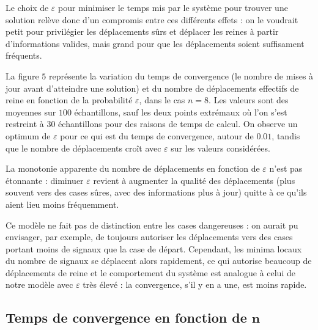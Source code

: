 \documentclass[11pt, openany]{article}
\begin{document}
Le choix de $\varepsilon$ pour minimiser le temps mis par le système pour trouver une solution relève donc d'un compromis entre ces différents effets : on le voudrait petit pour privilégier les déplacements sûrs et déplacer les reines à partir d'informations valides, mais grand pour que les déplacements soient suffisament fréquents.

La figure $5$ représente la variation du temps de convergence (le nombre de mises à jour avant d'atteindre une solution) et du nombre de déplacements effectifs de reine en fonction de la probabilité $\varepsilon$, dans le cas $n=8$. Les valeurs sont des moyennes sur $100$ échantillons, sauf les deux points extrémaux où l'on s'est restreint à $30$ échantillons pour des raisons de temps de calcul. On observe un optimum de $\varepsilon$ pour ce qui est du temps de convergence, autour de $0.01$, tandis que le nombre de déplacements croît avec $\varepsilon$ sur les valeurs considérées. 

La monotonie apparente du nombre de déplacements en fonction de $\varepsilon$ n'est pas étonnante : diminuer $\varepsilon$ revient à augmenter la qualité des déplacements (plus souvent vers des cases sûres, avec des informations plus à jour) quitte à ce qu'ils aient lieu moins fréquemment.


Ce modèle ne fait pas de distinction entre les cases dangereuses : on aurait pu envisager, par exemple, de toujours autoriser les déplacements vers des cases portant moins de signaux que la case de départ. Cependant, les minima locaux du nombre de signaux se déplacent alors rapidement, ce qui autorise beaucoup de déplacements de reine et le comportement du système est analogue à celui de notre modèle avec $\varepsilon$ très élevé : la convergence, s'il y en a une, est moins rapide. 

\subsection*{Temps de convergence en fonction de $\boldsymbol n$}
\end{document}
